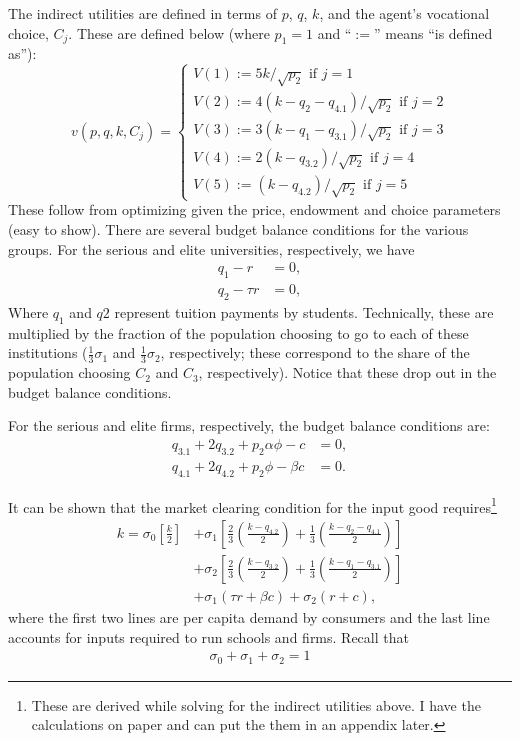 \documentclass[12pt,letterpaper]{article}
\begin{document}
	The indirect utilities are defined in terms of $p$, $q$, $k$, and the agent's vocational choice, $C_j$. 
	These are defined below (where $p_1=1$ and ``$:=$'' means ``is defined as''):
	\[
	v(p,q,k,C_j) = \begin{cases}
		V(1):=5k/\sqrt{p_2}\text{ if }j=1\\
		V(2):=4(k-q_2-q_{4.1})/\sqrt{p_2}\text{ if }j=2\\
		V(3):=3(k-q_1-q_{3.1})/\sqrt{p_2}\text{ if }j=3\\
		V(4):=2(k-q_{3.2})/\sqrt{p_2}\text{ if }j=4\\
		V(5):=(k-q_{4.2})/\sqrt{p_2}\text{ if }j=5
	\end{cases}
	\]
	These follow from optimizing given the price, endowment and choice parameters (easy to show).
	There are several budget balance conditions for the various groups.
	For the serious and elite universities, respectively, we have
	\begin{align}
		q_1-r&=0,\label{Eq:u-balance1}\\
		q_2-\tau r&=0,\label{Eq:u-balance2}
	\end{align}
	Where $q_1$ and $q2$ represent tuition payments by students.
	Technically, these are multiplied by the fraction of the population choosing to go to each of these institutions ($\frac{1}{3}\sigma_1$ and $\frac{1}{3}\sigma_2$, respectively; these correspond to the share of the population choosing $C_2$ and $C_3$, respectively).
	Notice that these drop out in the budget balance conditions.
	
	For the serious and elite firms, respectively, the budget balance conditions are:
	\begin{align}
		q_{3.1}+2q_{3.2}+p_2\alpha\phi-c&=0,\label{Eq:f-balance1}\\
		q_{4.1}+2q_{4.2}+p_2\phi-\beta c&=0.\label{Eq:f-balance2}
	\end{align}
	
	It can be shown that the market clearing condition for the input good requires\footnote
	{
		These are derived while solving for the indirect utilities above. I have the calculations on paper and can put the them in an appendix later.
	}
	\begin{align*}
	k=\sigma_0\left[\frac{k}{2}\right] 
	&+ \sigma_1
	\left[
		\frac{2}{3}\left(\frac{k-q_{4.2}}{2}\right)
		+\frac{1}{3}\left(\frac{k-q_2-q_{4.1}}{2}\right)
	\right]\\
	&+ \sigma_2
	\left[
		\frac{2}{3}\left(\frac{k-q_{3.2}}{2}\right)
		+\frac{1}{3}\left(\frac{k-q_1-q_{3.1}}{2}\right)
	\right]\\
	&+
	\sigma_1(\tau r+\beta c) + \sigma_2(r+c),
	\end{align*}
	where the first two lines are per capita demand by consumers and the last line accounts for inputs required to run schools and firms.
	Recall that
	\begin{align}\label{eq:sumsigmas}
		\sigma_0+\sigma_1+\sigma_2=1
	\end{align} 
	
\end{document}
